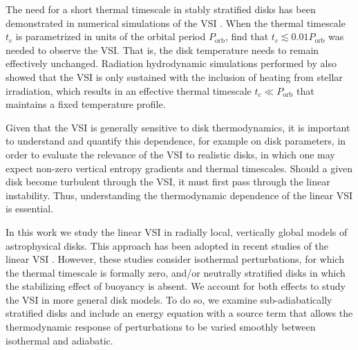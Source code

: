 \documentclass[iop]{emulateapj}
\begin{document}
The need for a short thermal timescale in stably stratified disks has
been demonstrated in numerical simulations of the VSI
\citep{nelson13,stoll14}. When the  thermal timescale $t_c$ is
parametrized in units of the orbital period  $P_\mathrm{orb}$,
\cite{nelson13} find that $t_c\lesssim  0.01P_\mathrm{orb}$ was needed
to observe the VSI. That is, the  disk temperature needs to remain
effectively unchanged. Radiation hydrodynamic simulations performed by
\cite{stoll14} also showed that the VSI is only sustained with the
inclusion of heating from stellar irradiation, which results in an
effective thermal timescale $t_c\ll P_\mathrm{orb}$ that maintains a
fixed temperature profile.     

Given that the VSI is generally sensitive to disk thermodynamics,  
it is important to understand and quantify this dependence, for
example on disk parameters, in order to evaluate the 
relevance of the VSI to realistic disks, in which one may expect
non-zero vertical entropy gradients and thermal timescales. Should a
given disk become turbulent through the VSI, it must first pass
through the linear instability. Thus, understanding the thermodynamic
dependence of the  linear VSI is essential.   

In this work we study the linear VSI in radially local, vertically
global models of astrophysical disks. This approach has
been adopted in recent studies of the linear VSI
\citep{nelson13,mcnally14,barker15}. However, these studies consider 
isothermal perturbations, for which the thermal timescale is formally
zero, and/or neutrally stratified disks in which the stabilizing
effect of buoyancy is absent. We account for both effects to study the
VSI in more general disk models. To do so, we examine 
sub-adiabatically stratified disks and include an energy equation 
with a source term that allows the thermodynamic response of 
perturbations to be varied smoothly between isothermal and 
adiabatic.   

\end{document}
